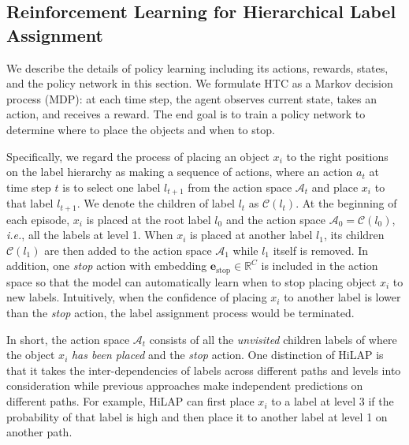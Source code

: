 \documentclass[11pt,a4paper]{article}
\newcommand{\start}[1]{\vspace{1.8mm}\noindent{{\bf #1}}}
\newcommand{\ie}{\textit{i.e.}} \newcommand{\eg}{\textit{e.g.}}
\begin{document}
\subsection{Reinforcement Learning for Hierarchical Label Assignment}
\label{sec_rl4taxo}
We describe the details of policy learning including its actions, rewards, states, and the policy network in this section.
We formulate HTC as a Markov decision process (MDP): at each time step, the agent observes current state, takes an action, and receives a reward.
The end goal is to train a policy network to determine where to place the objects and when to stop.

\start{Actions.}
Specifically, we regard the process of placing an object $x_i$ to the right positions on the label hierarchy as making a sequence of actions, where an action $a_t$ at time step $t$ is to select one label $l_{t+1}$ from the action space $\mathcal{A}_t$ and place $x_i$ to that label $l_{t+1}$.
We denote the children of label $l_t$ as $\mathcal{C}(l_t)$.
At the beginning of each episode, $x_i$ is placed at the root label $l_0$ and the action space $\mathcal{A}_0 = \mathcal{C}(l_0)$, \ie, all the labels at level 1.
When $x_i$ is placed at another label $l_1$, its children $\mathcal{C}(l_1)$ are then added to the action space $\mathcal{A}_1$ while $l_1$ itself is removed.
In addition, one \textit{stop} action with embedding $\textbf{e}_{\text{stop}} \in \mathbb{R}^C$ is included in the action space so that the model can automatically learn when to stop placing object $x_i$ to new labels.
Intuitively, when the confidence of placing $x_i$ to another label is lower than the \textit{stop} action, the label assignment process would be terminated.

In short, the action space $\mathcal{A}_t$ consists of all the \textit{unvisited} children labels of where the object $x_i$ \textit{has been placed} and the \textit{stop} action.
One distinction of HiLAP is that it takes the inter-dependencies of labels across different paths and levels into consideration while previous approaches make independent predictions on different paths.
For example, HiLAP can first place $x_i$ to a label at level 3 if the probability of that label is high and then place it to another label at level 1 on another path.
\end{document}
